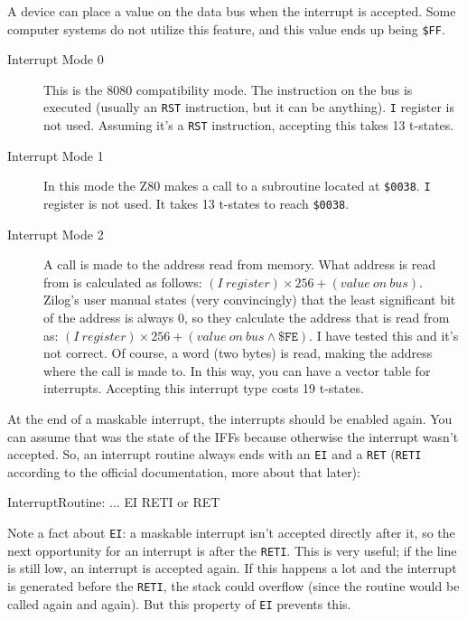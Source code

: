 A device can place a value on the data bus when the interrupt is accepted. Some computer systems do not utilize this feature, and this value ends up being {\tt \$FF}.

\begin{description}

	\item[Interrupt Mode 0]
	This is the 8080 compatibility mode. The instruction on the bus is executed (usually an {\tt RST} instruction, but it can be anything). {\tt I} register is not used. Assuming it's a {\tt RST} instruction, accepting this takes 13 t-states.

	\item[Interrupt Mode 1]
	In this mode the Z80 makes a call to a subroutine located at {\tt \$0038}. {\tt I} register is not used. It takes 13 t-states to reach {\tt \$0038}.

	\item[Interrupt Mode 2]
	A call is made to the address read from memory. What address is read from is calculated as follows: $(I\ register) \times 256 + (value\ on\ bus)$. Zilog's user manual states (very convincingly) that the least significant bit of the address is always 0, so they calculate the address that is read from as: $(I\ register) \times 256 + (value\ on\ bus \wedge \mathtt{\$FE})$. I have tested this and it's not correct. Of course, a word (two bytes) is read, making the address where the call is made to. In this way, you can have a vector table for interrupts. Accepting this interrupt type costs 19 t-states.

\end{description}

At the end of a maskable interrupt, the interrupts should be enabled again. You can assume that was the state of the IFFs because otherwise the interrupt wasn't accepted. So, an interrupt routine always ends with an {\tt EI} and a {\tt RET} ({\tt RETI} according to the official documentation, more about that later):

\begin{tcblisting}{}
InterruptRoutine:
	...
	EI
	RETI or RET
\end{tcblisting}

Note a fact about {\tt EI}: a maskable interrupt isn't accepted directly after it, so the next opportunity for an interrupt is after the {\tt RETI}. This is very useful; if the  line is still low, an interrupt is accepted again.  If this happens a lot and the interrupt is generated before the {\tt RETI}, the stack could overflow (since the routine would be called again and again). But this property of {\tt EI} prevents this.

